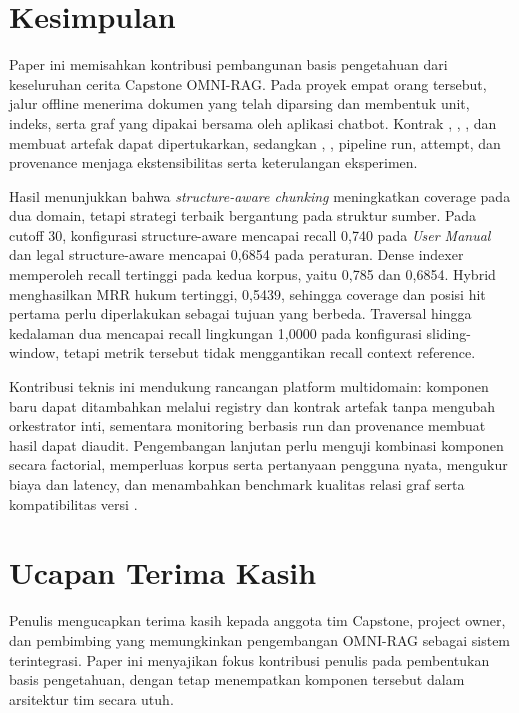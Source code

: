 \section{Kesimpulan}

Paper ini memisahkan kontribusi pembangunan basis pengetahuan dari keseluruhan cerita Capstone OMNI-RAG. Pada proyek empat orang tersebut, jalur offline menerima dokumen yang telah diparsing dan membentuk unit, indeks, serta graf yang dipakai bersama oleh aplikasi chatbot. Kontrak , , , dan  membuat artefak dapat dipertukarkan, sedangkan \plugin{}, \profile{}, pipeline run, attempt, dan provenance menjaga ekstensibilitas serta keterulangan eksperimen.

Hasil menunjukkan bahwa \textit{structure-aware chunking} meningkatkan coverage pada dua domain, tetapi strategi terbaik bergantung pada struktur sumber. Pada cutoff 30, konfigurasi structure-aware mencapai recall 0,740 pada \textit{User Manual} dan legal structure-aware mencapai 0,6854 pada peraturan. Dense indexer memperoleh recall tertinggi pada kedua korpus, yaitu 0,785 dan 0,6854. Hybrid menghasilkan MRR hukum tertinggi, 0,5439, sehingga coverage dan posisi hit pertama perlu diperlakukan sebagai tujuan yang berbeda. Traversal \kg{} hingga kedalaman dua mencapai recall lingkungan 1,0000 pada konfigurasi sliding-window, tetapi metrik tersebut tidak menggantikan recall context reference.

Kontribusi teknis ini mendukung rancangan platform multidomain: komponen baru dapat ditambahkan melalui registry dan kontrak artefak tanpa mengubah orkestrator inti, sementara monitoring berbasis run dan provenance membuat hasil dapat diaudit. Pengembangan lanjutan perlu menguji kombinasi komponen secara factorial, memperluas korpus serta pertanyaan pengguna nyata, mengukur biaya dan latency, dan menambahkan benchmark kualitas relasi graf serta kompatibilitas versi \plugin{}.

\section*{Ucapan Terima Kasih}
Penulis mengucapkan terima kasih kepada anggota tim Capstone, project owner, dan pembimbing yang memungkinkan pengembangan OMNI-RAG sebagai sistem terintegrasi. Paper ini menyajikan fokus kontribusi penulis pada pembentukan basis pengetahuan, dengan tetap menempatkan komponen tersebut dalam arsitektur tim secara utuh.


